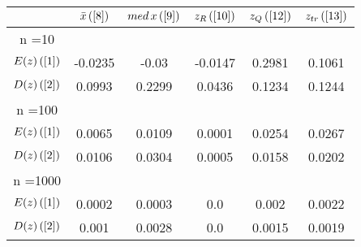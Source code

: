 \begin{tabular}{|c|c|c|c|c|c|}
\hline
 & $\bar{x} \, (\ref{8})$ & $med \, x \, (\ref{9})$ & $z_R \, (\ref{10})$ & $z_Q \, (\ref{12})$ & $z_{tr} \, (\ref{13})$ \\
\hline
n =10 &  &  &  &  & \\
\hline
$E(z) \, (\ref{1})$ & -0.0235 & -0.03 & -0.0147 & 0.2981 & 0.1061\\
\hline
$D(z) \, (\ref{2})$ & 0.0993 & 0.2299 & 0.0436 & 0.1234 & 0.1244\\
\hline
n =100 &  &  &  &  & \\
\hline
$E(z) \, (\ref{1})$ & 0.0065 & 0.0109 & 0.0001 & 0.0254 & 0.0267\\
\hline
$D(z) \, (\ref{2})$ & 0.0106 & 0.0304 & 0.0005 & 0.0158 & 0.0202\\
\hline
n =1000 &  &  &  &  & \\
\hline
$E(z) \, (\ref{1})$ & 0.0002 & 0.0003 & 0.0 & 0.002 & 0.0022\\
\hline
$D(z) \, (\ref{2})$ & 0.001 & 0.0028 & 0.0 & 0.0015 & 0.0019\\
\hline
\end{tabular}